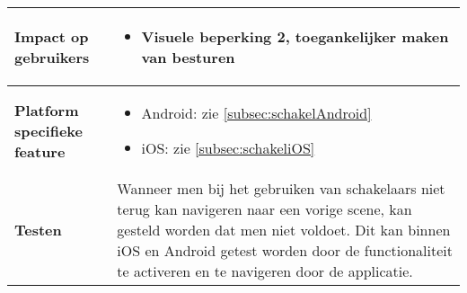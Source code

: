 \begin{table}[H]
\begin{tabular}{|l|p{12cm}|}
        \hline
        \textbf{Impact op gebruikers}         &  
        \begin{itemize}
            \item Visuele beperking 2, toegankelijker maken van besturen
        \end{itemize}                                                                                                                                                                                                                                                                                                                                                                                                                    \\ 
        \hline
        \textbf{Platform specifieke feature}  & \begin{itemize}
            \item Android: zie \ref{subsec:schakelAndroid}
            \item iOS: zie \ref{subsec:schakeliOS}
        \end{itemize}                                                                                                                                                                                                                                                                                                                                   \\ 
        \hline
        \textbf{Testen}                       & Wanneer men bij het gebruiken van schakelaars niet terug kan navigeren naar een vorige scene, kan gesteld worden dat men niet voldoet.  Dit kan binnen iOS en Android getest worden door de functionaliteit te activeren en te navigeren door de applicatie.                                                                                                                                                                                                                                                             \\
        \hline
    \end{tabular}
\end{table}

